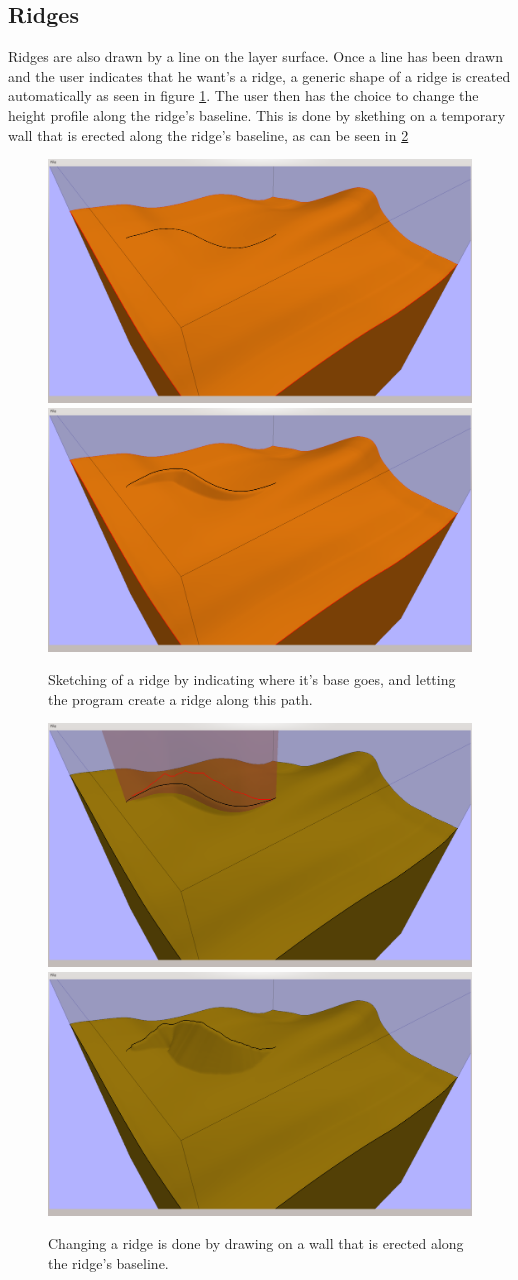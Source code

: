 \documentclass[a4paper,12pt]{report}
\begin{document}
\subsection{Ridges}
Ridges are also drawn by a line on the layer surface. Once a line has been drawn and the user indicates that he want's a ridge, a generic shape of a ridge is created automatically as seen in figure \ref{fig:ridgeDraw}. The user then has the choice to change the height profile along the ridge's baseline. This is done by skething on a temporary wall that is erected along the ridge's baseline, as can be seen in \ref{fig:ridgeChange}

\begin{figure}
\includegraphics[trim = 30mm 80mm 120mm 30mm, clip,width=.5\linewidth]{thesis/results/ridgeDraw.png}
\includegraphics[trim = 30mm 80mm 120mm 30mm, clip,width=.5\linewidth]{thesis/results/ridgeDrawn.png}
 \caption{Sketching of a ridge by indicating where it's base goes, and letting the program create a ridge along this path. }
 \label{fig:ridgeDraw}
\end{figure}

\begin{figure}
\includegraphics[trim = 30mm 80mm 120mm 30mm, clip,width=.5\linewidth]{thesis/results/ridgeChange.png}
\includegraphics[trim = 30mm 80mm 120mm 30mm, clip,width=.5\linewidth]{thesis/results/ridgeChanged.png}
 \caption{Changing a ridge is done by drawing on a wall that is erected along the ridge's baseline. }
 \label{fig:ridgeChange}
\end{figure}
\end{document}
